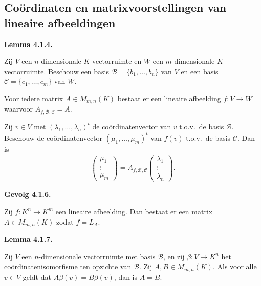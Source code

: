 \documentclass[10pt,a4paper]{article}
\newenvironment{res}[2]{%
  \par\noindent\textbf{#1 #2.}%
}{%
  \par\vspace{2pt}\normalfont
}
\begin{document}
\subsection{Coördinaten en matrixvoorstellingen van lineaire afbeeldingen}
\begin{res}{Lemma}{4.1.4}
Zij $V$ een $n$-dimensionale $K$-vectorruimte en $W$ een $m$-dimensionale $K$-vectorruimte. Beschouw een basis $\mathcal B=\{b_1,\dots,b_n\}$ van $V$ en een basis $\mathcal C=\{c_1,\dots,c_m\}$ van $W$.
\begin{myenum}
\item Voor iedere matrix $A\in M_{m,n}(K)$ bestaat er een lineaire afbeelding $f:V\to W$ waarvoor $A_{f,\mathcal B,\mathcal C}=A$.
\item Zij $v\in V$ met $(\lambda_1,\dots,\lambda_n)^t$ de co\"ordinatenvector van $v$ t.o.v.\ de basis $\mathcal B$. Beschouw de co\"ordinatenvector $(\mu_1,\dots,\mu_m)^t$ van $f(v)$ t.o.v.\ de basis $\mathcal C$. Dan is
\[
\begin{pmatrix}\mu_1\\ \vdots \\ \mu_m\end{pmatrix} = A_{f,\mathcal B,\mathcal C}\begin{pmatrix}\lambda_1\\ \vdots \\ \lambda_n\end{pmatrix}.
\]
\end{myenum}
\end{res}

\begin{res}{Gevolg}{4.1.6}
Zij $f:K^n\to K^m$ een lineaire afbeelding. Dan bestaat er een matrix $A\in M_{m,n}(K)$ zodat $f=L_A$.
\end{res}

\begin{res}{Lemma}{4.1.7}
Zij $V$ een $n$-dimensionale vectorruimte met basis $\mathcal B$, en zij $\beta:V\to K^n$ het co\"ordinatenisomorfisme ten opzichte van $\mathcal B$. Zij $A,B\in M_{m,n}(K)$. Als voor alle $v\in V$ geldt dat $A\beta(v)=B\beta(v)$, dan is $A=B$.
\end{res}
\end{document}
